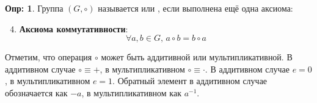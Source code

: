 \documentclass[12pt]{article}
\theoremstyle{definition}
\newtheorem{defn}{Опр:}
\begin{document}
\begin{defn}
	Группа $(G, \circ)$ называется  или , если выполнена ещё одна аксиома:
	\begin{enumerate}[label=\arabic*)]
		\setcounter{enumi}{3}
		\item \textbf{Аксиома коммутативности}:
			$$
				\forall a,b \in G, \, a \circ b = b \circ a
			$$
	\end{enumerate}
\end{defn}

Отметим, что операция $\circ$ может быть аддитивной или мультипликативной. В аддитивном случае $\circ \equiv +$, в мультипликативном $\circ \equiv \cdot$. В аддитивном случае $e = 0$, в мультипликативном $e = 1$. Обратный элемент в аддитивном случае обозначается как $-a$, в мультипликативном как $a^{-1}$.
\end{document}
